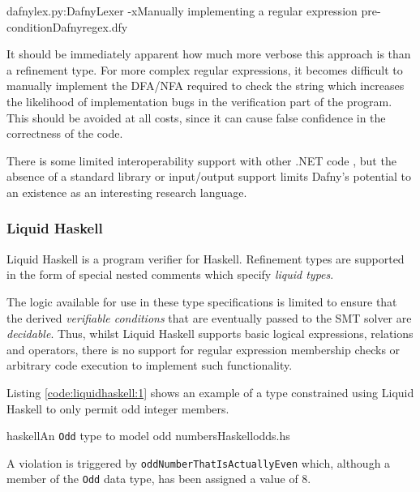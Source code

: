 \documentclass[a4paper,openany,12pt]{book}
\begin{document}
\begin{mycodefile}{dafnylex.py:DafnyLexer -x}{\label{code:dafny:3}Manually implementing a regular expression pre-condition}{Dafny}{regex.dfy}
    
    It should be immediately apparent how much more verbose this approach is than a refinement type.
    For more complex regular expressions, it becomes difficult to manually implement the DFA/NFA required to check the
    string which increases the likelihood of implementation bugs in the verification part of the program.
    This should be avoided at all costs, since it can cause false confidence in the correctness of the code.

    \vspace{0.5em}
\end{mycodefile}


There is some limited interoperability support with other .NET code \citep{wilcowio}, but the absence of a standard
library or input/output support limits Dafny's potential to an existence as an interesting research language.

\subsubsection{Liquid Haskell}
\label{lh}
Liquid Haskell is a program verifier for Haskell.
Refinement types are supported in the form of special nested comments which specify \emph{liquid types}.

The logic available for use in these type specifications is limited to ensure that the derived \emph{verifiable
conditions} that are eventually passed to the SMT solver are \emph{decidable}.
Thus, whilst Liquid Haskell supports basic logical expressions, relations and operators, there is no support for regular
expression membership checks or arbitrary code execution to implement such functionality.

Listing \ref{code:liquidhaskell:1} shows an example of a type constrained using Liquid Haskell to only permit odd
integer members.

\begin{mycodefile}{haskell}{\label{code:liquidhaskell:1}An \texttt{Odd} type to model odd numbers}{Haskell}{odds.hs}
    
    A violation is triggered by \texttt{oddNumberThatIsActuallyEven} which, although a member of the \texttt{Odd} data
    type, has been assigned a value of 8.
    \vspace{0.5em}
\end{mycodefile}
\end{document}
